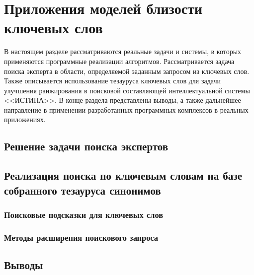 \chapter{Приложения моделей близости ключевых слов} \label{chapt1}
В настоящем разделе рассматриваются реальные задачи и системы, в которых применяются программные реализации алгоритмов. 
Рассматривается задача поиска эксперта в области, определяемой заданным запросом из ключевых слов.
Также описывается использование тезауруса ключевых слов для задачи улучшения ранжирования в поисковой составляющей интеллектуальной системы <<ИСТИНА>>.
В конце раздела представлены выводы, а также дальнейшее направление в применении разработанных программных комплексов в реальных приложениях.

\section{Решение задачи поиска экспертов}
\section{Реализация поиска по ключевым словам на базе собранного тезауруса синонимов}
\subsection{Поисковые подсказки для ключевых слов}
\subsection{Методы расширения поискового запроса}
\section{Выводы}
